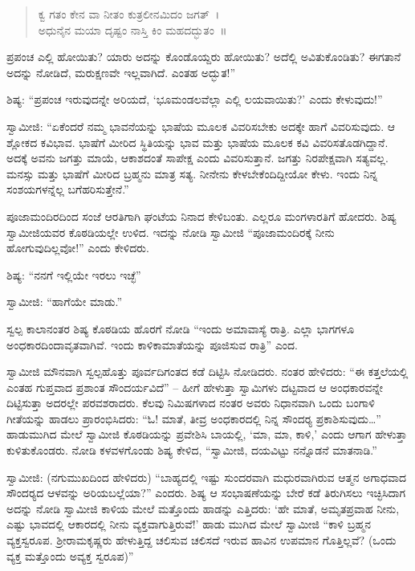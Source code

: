 \begin{verse}
ಕ್ವ ಗತಂ ಕೇನ ವಾ ನೀತಂ ಕುತ್ರಲೀನಮಿದಂ ಜಗತ್~।\\ಅಧುನೈನ ಮಯಾ ದೃಷ್ಟಂ ನಾಸ್ತಿ ಕಿಂ ಮಹದದ್ಭುತಂ~॥ 
\end{verse}

 ಪ್ರಪಂಚ ಎಲ್ಲಿ ಹೋಯಿತು? ಯಾರು ಅದನ್ನು ಕೊಂಡೊಯ್ದರು ಹೋಯಿತು? ಅದೆಲ್ಲಿ ಅವಿತುಕೊಂಡಿತು? ಈಗತಾನೆ ಅದನ್ನು ನೋಡಿದೆ, ಮರುಕ್ಷಣವೇ ಇಲ್ಲವಾಗಿದೆ. ಎಂತಹ ಅದ್ಭುತ!” 

 ಶಿಷ್ಯ: “ಪ್ರಪಂಚ ಇರುವುದನ್ನೇ ಅರಿಯದೆ, ‘ಭೂಮಂಡಲವೆಲ್ಲಾ ಎಲ್ಲಿ ಲಯವಾಯಿತು?’ ಎಂದು ಕೇಳುವುದು!” 

 ಸ್ವಾಮೀಜಿ: “ಏಕೆಂದರೆ ನಮ್ಮ ಭಾವನೆಯನ್ನು ಭಾಷೆಯ ಮೂಲಕ ವಿವರಿಸಬೇಕು ಅದಕ್ಕೇ ಹಾಗೆ ವಿವರಿಸುವುದು. ಆ ಶ್ಲೋಕದ ಕವಿಭಾವ. ಭಾಷೆಗೆ ಮೀರಿದ ಸ್ಥಿತಿಯನ್ನು ಭಾವ ಮತ್ತು ಭಾಷೆಯ ಮೂಲಕ ಕವಿ ವಿವರಿಸತೊಡಗಿದ್ದಾನೆ. ಅದಕ್ಕೆ ಅವನು ಜಗತ್ತು ಮಾಯೆ, ಆಕಾಶದಂತೆ ಸಾಪೇಕ್ಷ ಎಂದು ವಿವರಿಸುತ್ತಾನೆ. ಜಗತ್ತು ನಿರಪೇಕ್ಷವಾಗಿ ಸತ್ಯವಲ್ಲ. ಮನಸ್ಸು ಮತ್ತು ಭಾಷೆಗೆ ಮೀರಿದ ಬ್ರಹ್ಮನು ಮಾತ್ರ ಸತ್ಯ. ನೀನೇನು ಕೇಳಬೇಕೆಂದಿದ್ದೀಯೋ ಕೇಳು. ಇಂದು ನಿನ್ನ ಸಂಶಯಗಳನ್ನೆಲ್ಲ ಬಗೆಹರಿಸುತ್ತೇನೆ.” 

 ಪೂಜಾಮಂದಿರದಿಂದ ಸಂಜೆ ಆರತಿಗಾಗಿ ಘಂಟೆಯ ನಿನಾದ ಕೇಳಿಬಂತು. ಎಲ್ಲರೂ ಮಂಗಳಾರತಿಗೆ ಹೋದರು. ಶಿಷ್ಯ ಸ್ವಾಮೀಜಿಯವರ ಕೊಠಡಿಯಲ್ಲೇ ಉಳಿದ. ಇದನ್ನು ನೋಡಿ ಸ್ವಾಮೀಜಿ “ಪೂಜಾಮಂದಿರಕ್ಕೆ ನೀನು ಹೋಗುವುದಿಲ್ಲವೋ!” ಎಂದು ಕೇಳಿದರು. 

 ಶಿಷ್ಯ: “ನನಗೆ ಇಲ್ಲಿಯೇ ಇರಲು ಇಚ್ಛೆ” 

 ಸ್ವಾಮೀಜಿ: “ಹಾಗೆಯೇ ಮಾಡು.” 

 ಸ್ವಲ್ಪ ಕಾಲಾನಂತರ ಶಿಷ್ಯ ಕೊಠಡಿಯ ಹೊರಗೆ ನೋಡಿ “ಇಂದು ಅಮಾವಾಸ್ಯೆ ರಾತ್ರಿ. ಎಲ್ಲಾ ಭಾಗಗಳೂ ಅಂಧಕಾರದಿಂದಾವೃತವಾಗಿವೆ. ಇಂದು ಕಾಳಿಕಾಮಾತೆಯನ್ನು ಪೂಜಿಸುವ ರಾತ್ರಿ” ಎಂದ. 

 ಸ್ವಾಮೀಜಿ ಮೌನವಾಗಿ ಸ್ವಲ್ಪಹೊತ್ತು ಪೂರ್ವದಿಗಂತದ ಕಡೆ ದಿಟ್ಟಿಸಿ ನೋಡಿದರು. ನಂತರ ಹೇಳಿದರು: “ಈ ಕತ್ತಲೆಯಲ್ಲಿ ಎಂತಹ ಗುಪ್ತವಾದ ಪ್ರಶಾಂತ ಸೌಂದರ್ಯವಿದೆ” – ಹೀಗೆ ಹೇಳುತ್ತಾ ಸ್ವಾಮಿಗಳು ದಟ್ಟವಾದ ಆ ಅಂಧಕಾರವನ್ನೇ ದಿಟ್ಟಿಸುತ್ತಾ ಅದರಲ್ಲೇ ಪರವಶರಾದರು. ಕೆಲವು ನಿಮಿಷಗಳಾದ ನಂತರ ಅವರು ನಿಧಾನವಾಗಿ ಒಂದು ಬಂಗಾಳಿ ಗೀತೆಯನ್ನು ಹಾಡಲು ಪ್ರಾರಂಭಿಸಿದರು: “ಓ! ಮಾತೆ, ತೀವ್ರ ಅಂಧಕಾರದಲ್ಲಿ ನಿನ್ನ ಸೌಂದರ‍್ಯ ಪ್ರಕಾಶಿಸುವುದು…” ಹಾಡುಮುಗಿದ ಮೇಲೆ ಸ್ವಾಮೀಜಿ ಕೊಠಡಿಯನ್ನು ಪ್ರವೇಶಿಸಿ ಬಾಯಲ್ಲಿ, ‘ಮಾ, ಮಾ, ಕಾಳಿ,’ ಎಂದು ಆಗಾಗ ಹೇಳುತ್ತಾ ಕುಳಿತುಕೊಂಡರು. ನೋಡಿ ಕಳವಳಗೊಂಡು ಶಿಷ್ಯ ಕೇಳಿದ, “ಸ್ವಾಮೀಜಿ, ದಯವಿಟ್ಟು ನನ್ನೊಡನೆ ಮಾತನಾಡಿ.” 

 ಸ್ವಾಮೀಜಿ: (ನಗುಮುಖದಿಂದ ಹೇಳಿದರು) “ಬಾಹ್ಯದಲ್ಲಿ ಇಷ್ಟು ಸುಂದರವಾಗಿ ಮಧುರವಾಗಿರುವ ಆತ್ಮನ ಅಗಾಧವಾದ ಸೌಂದರ‍್ಯದ ಆಳವನ್ನು ಅರಿಯಬಲ್ಲೆಯಾ?” ಎಂದರು. ಶಿಷ್ಯ ಆ ಸಂಭಾಷಣೆಯನ್ನು ಬೇರೆ ಕಡೆ ತಿರುಗಿಸಲು ಇಚ್ಛಿಸಿದಾಗ ಅದನ್ನು ನೋಡಿ ಸ್ವಾಮೀಜಿ ಕಾಳಿಯ ಮೇಲೆ ಮತ್ತೊಂದು ಹಾಡನ್ನು ಎತ್ತಿದರು: ‘ಹೇ ಮಾತೆ, ಅಮೃತಪ್ರವಾಹ ನೀನು, ಎಷ್ಟು ಭಾವದಲ್ಲಿ ಆಕಾರದಲ್ಲಿ ನೀನು ವ್ಯಕ್ತವಾಗುತ್ತಿರುವೆ!’ ಹಾಡು ಮುಗಿದ ಮೇಲೆ ಸ್ವಾಮೀಜಿ “ಕಾಳಿ ಬ್ರಹ್ಮನ ವ್ಯಕ್ತಸ್ವರೂಪ. ಶ‍್ರೀರಾಮಕೃಷ್ಣರು ಹೇಳುತ್ತಿದ್ದ ಚಲಿಸುವ ಚಲಿಸದೆ ಇರುವ ಹಾವಿನ ಉಪಮಾನ ಗೊತ್ತಿಲ್ಲವೆ? (ಒಂದು ವ್ಯಕ್ತ ಮತ್ತೊಂದು ಅವ್ಯಕ್ತ ಸ್ವರೂಪ)” 

